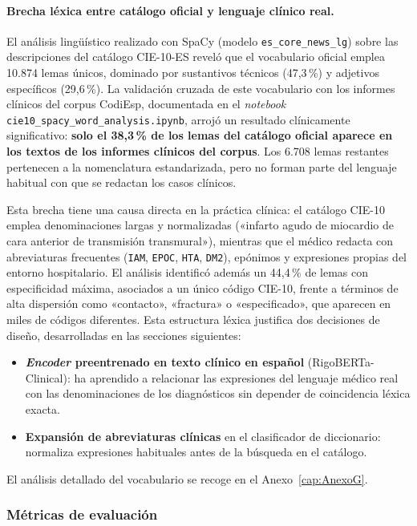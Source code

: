 \paragraph{Brecha léxica entre catálogo oficial y lenguaje clínico real.}
El análisis lingüístico realizado con SpaCy (modelo \texttt{es\_core\_news\_lg}) sobre las descripciones del catálogo CIE-10-ES reveló que el vocabulario oficial emplea 10.874 lemas únicos, dominado por sustantivos técnicos (47,3\,\%) y adjetivos específicos (29,6\,\%). La validación cruzada de este vocabulario con los informes clínicos del corpus CodiEsp, documentada en el \emph{notebook} \texttt{cie10\_spacy\_word\_analysis.ipynb}, arrojó un resultado clínicamente significativo: \textbf{solo el 38,3\,\% de los lemas del catálogo oficial aparece en los textos de los informes clínicos del corpus}. Los 6.708 lemas restantes pertenecen a la nomenclatura estandarizada, pero no forman parte del lenguaje habitual con que se redactan los casos clínicos.

Esta brecha tiene una causa directa en la práctica clínica: el catálogo CIE-10 emplea denominaciones largas y normalizadas («infarto agudo de miocardio de cara anterior de transmisión transmural»), mientras que el médico redacta con abreviaturas frecuentes (\texttt{IAM}, \texttt{EPOC}, \texttt{HTA}, \texttt{DM2}), epónimos y expresiones propias del entorno hospitalario. El análisis identificó además un 44,4\,\% de lemas con especificidad máxima, asociados a un único código CIE-10, frente a términos de alta dispersión como «contacto», «fractura» o «especificado», que aparecen en miles de códigos diferentes. Esta estructura léxica justifica dos decisiones de diseño, desarrolladas en las secciones siguientes:

\begin{itemize}
 \item \textbf{\emph{Encoder} preentrenado en texto clínico en español} (RigoBERTa-Clinical): ha aprendido a relacionar las expresiones del lenguaje médico real con las denominaciones de los diagnósticos sin depender de coincidencia léxica exacta.
 \item \textbf{Expansión de abreviaturas clínicas} en el clasificador de diccionario: normaliza expresiones habituales antes de la búsqueda en el catálogo.
\end{itemize}

El análisis detallado del vocabulario se recoge en el Anexo~\ref{cap:AnexoG}.

\subsubsection{Métricas de evaluación}
\label{sec:metricas}

